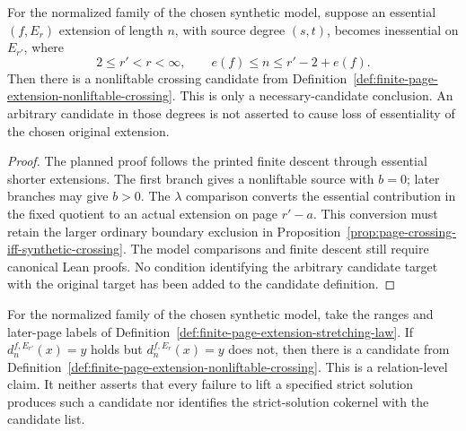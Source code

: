 \begin{proposition}
  \label{prop:page-extension-loss-certificate}
  \notready
  For the normalized family of the chosen synthetic model, suppose an
  essential $(f,E_r)$ extension of length $n$, with source degree $(s,t)$,
  becomes inessential on $E_{r'}$, where
  \[
    2\le r'<r<\infty,\qquad e(f)\le n\le r'-2+e(f).
  \]
  Then there is a nonliftable crossing candidate from
  Definition~\ref{def:finite-page-extension-nonliftable-crossing}.
  This is only a necessary-candidate conclusion.  An arbitrary candidate
  in those degrees is not asserted to cause loss of essentiality of the
  chosen original extension.
\end{proposition}

\begin{proof}
  The planned proof follows the printed finite descent through essential
  shorter extensions.  The first branch gives a nonliftable source with
  $b=0$; later branches may give $b>0$.  The $\lambda$ comparison converts
  the essential contribution in the fixed quotient to an actual extension
  on page $r'-a$.  This conversion must retain the larger ordinary
  boundary exclusion in
  Proposition~\ref{prop:page-crossing-iff-synthetic-crossing}.
  The model comparisons and finite descent still require canonical Lean
  proofs.  No condition identifying the arbitrary candidate target with
  the original target has been added to the candidate definition.
\end{proof}

\begin{lemma}
  \label{lem:page-extension-first-obstruction}
  \notready
  For the normalized family of the chosen synthetic model, take the ranges
  and later-page labels of
  Definition~\ref{def:finite-page-extension-stretching-law}.  If
  $d_n^{f,E_{r'}}(x)=y$ holds but $d_n^{f,E_r}(x)=y$ does not, then there
  is a candidate from
  Definition~\ref{def:finite-page-extension-nonliftable-crossing}.
  This is a relation-level claim.  It neither asserts that every failure
  to lift a specified strict solution produces such a candidate nor
  identifies the strict-solution cokernel with the candidate list.
\end{lemma}

